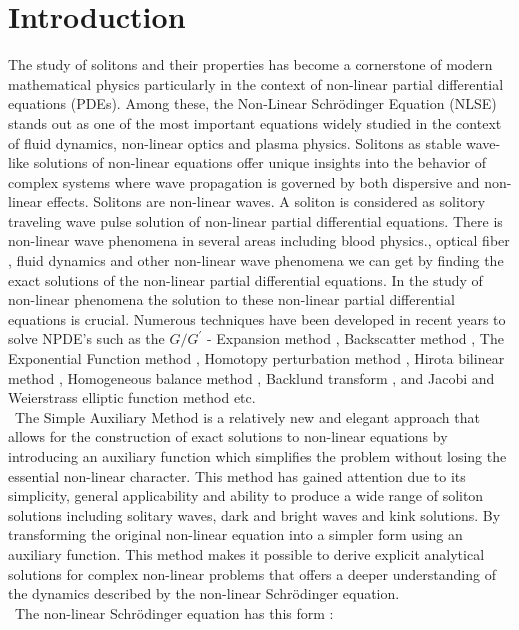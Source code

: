 \documentclass{article}
\numberwithin{equation}{section}
\begin{document}
\section{Introduction}
\noindent The study of solitons and their properties has become a cornerstone of modern mathematical physics particularly in the context of non-linear partial differential equations (PDEs). Among these, the Non-Linear Schr\"{o}dinger Equation (NLSE) stands out as one of the most important equations widely studied in the context of fluid dynamics, non-linear optics and plasma physics. Solitons as stable wave-like solutions of non-linear equations offer unique insights into the behavior of complex systems where wave propagation is governed by both dispersive and non-linear effects. Solitons are non-linear waves. A soliton is considered as solitory traveling wave pulse solution of non-linear partial differential equations. There is non-linear wave phenomena in several areas including blood physics.\cite{A1,A2,A3}, optical fiber \cite{a4,a5,a6,a7}, fluid dynamics \cite{a8,a9} and other non-linear wave phenomena we can get by finding the exact solutions of the non-linear partial differential equations. In the study of non-linear phenomena the solution to these non-linear partial differential equations is crucial. Numerous techniques have been developed in recent years to solve NPDE's such as the $G/G^{'}$ - Expansion method \cite{a8}, Backscatter method \cite{a10}, The Exponential Function method \cite{a11}, Homotopy perturbation method \cite{a12}, Hirota bilinear method \cite{a13}, Homogeneous balance method \cite{a14}, Backlund transform \cite{a15}, and Jacobi and Weierstrass elliptic function method \cite{a16} etc.\\\
The Simple Auxiliary Method is a relatively new and elegant approach that allows for the construction of exact solutions to non-linear equations by introducing an auxiliary function which simplifies the problem without losing the essential non-linear character. This method has gained attention due to its simplicity, general applicability and ability to produce a wide range of soliton solutions including solitary waves, dark and bright waves and kink solutions. By transforming the original non-linear equation into a simpler form using an auxiliary function. This method makes it possible to derive explicit analytical solutions for complex non-linear problems that offers a deeper understanding of the dynamics described by the non-linear Schr\"{o}dinger equation.\\\
The non-linear Schr\"{o}dinger equation has this form \cite{a17}:
\end{document}
